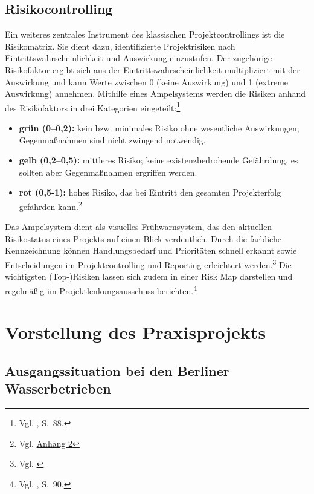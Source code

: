 \documentclass[
    12pt, 
    a4paper,
    ]{scrartcl} %
\begin{document}
\subsection{Risikocontrolling}
Ein weiteres zentrales Instrument des klassischen Projektcontrollings ist die Risikomatrix. Sie dient dazu, identifizierte Projektrisiken nach Eintrittswahrscheinlichkeit und Auswirkung einzustufen. Der zugehörige Risikofaktor ergibt sich aus der Eintrittswahrscheinlichkeit multipliziert mit der Auswirkung und kann Werte zwischen 0 (keine Auswirkung) und 1 (extreme Auswirkung) annehmen. Mithilfe eines Ampelsystems werden die Risiken anhand des Risikofaktors in drei Kategorien eingeteilt:\footnote{Vgl. \cite{Nobach_Projektcontrolling}, S.~88.}
\begin{itemize}
    \setlength\itemsep{0.4\baselineskip}
    \setlength\parskip{0pt}
    \setlength\parsep{0pt}
    \item \textbf{grün (0–0,2):} kein bzw. minimales Risiko ohne wesentliche Auswirkungen; Gegenmaßnahmen sind nicht zwingend notwendig.
    \item \textbf{gelb (0,2–0,5):} mittleres Risiko; keine existenzbedrohende Gefährdung, es sollten aber Gegenmaßnahmen ergriffen werden.
    \item \textbf{rot (0,5-1):} hohes Risiko, das bei Eintritt den gesamten Projekterfolg gefährden kann.\footnote{Vgl. \hyperref[sec:Anhang2]{Anhang 2}}
\end{itemize}
Das Ampelsystem dient als visuelles Frühwarnsystem, das den aktuellen Risikostatus eines Projekts auf einen Blick verdeutlich. Durch die farbliche Kennzeichnung können Handlungsbedarf und Prioritäten schnell erkannt sowie Entscheidungen im Projektcontrolling und Reporting erleichtert werden.\footnote{Vgl. \cite{Factro_Ampelstatus}} Die wichtigsten (Top-)Risiken lassen sich zudem in einer Risk Map darstellen und regelmäßig im Projektlenkungsausschuss berichten.\footnote{Vgl. \cite{Nobach_Projektcontrolling}, S.~90.}

\section{Vorstellung des Praxisprojekts}

\subsection{Ausgangssituation bei den Berliner Wasserbetrieben}
\end{document}
